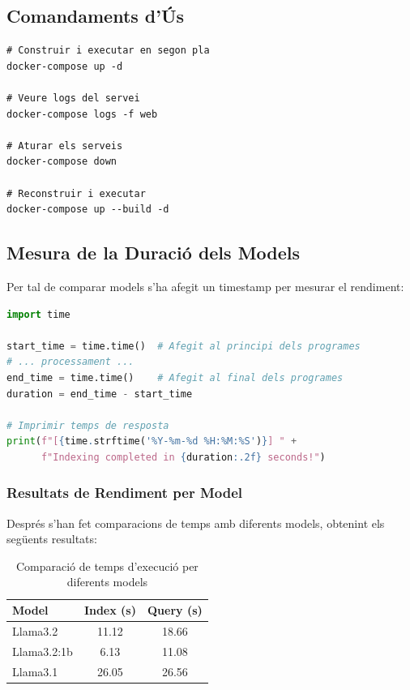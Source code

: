 \documentclass[12pt,a4paper]{article}
\begin{document}
\subsection{Comandaments d'Ús}

\begin{lstlisting}[style=shellstyle]
# Construir i executar en segon pla
docker-compose up -d

# Veure logs del servei
docker-compose logs -f web

# Aturar els serveis
docker-compose down

# Reconstruir i executar
docker-compose up --build -d
\end{lstlisting}

\subsection{Mesura de la Duració dels Models}

Per tal de comparar models s'ha afegit un timestamp per mesurar el rendiment:

\begin{lstlisting}[language=Python,caption=Mesura de temps d'execució]
import time

start_time = time.time()  # Afegit al principi dels programes
# ... processament ...
end_time = time.time()    # Afegit al final dels programes
duration = end_time - start_time

# Imprimir temps de resposta
print(f"[{time.strftime('%Y-%m-%d %H:%M:%S')}] " +
      f"Indexing completed in {duration:.2f} seconds!")
\end{lstlisting}

\subsubsection{Resultats de Rendiment per Model}

Després s'han fet comparacions de temps amb diferents models, obtenint els següents resultats:

\begin{table}[H]
\centering
\begin{tabular}{@{}lcc@{}}
\toprule
\textbf{Model} & \textbf{Index (s)} & \textbf{Query (s)} \\
\midrule
Llama3.2 & 11.12 & 18.66 \\
Llama3.2:1b & 6.13 & 11.08 \\
Llama3.1 & 26.05 & 26.56 \\
\bottomrule
\end{tabular}
\caption{Comparació de temps d'execució per diferents models}
\end{table}
\end{document}
